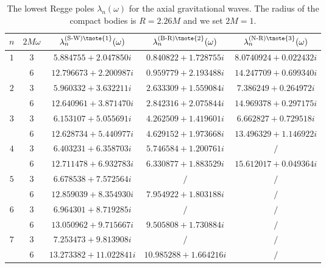\documentclass[aps,prd,longbibliography,reprint,twocolumn,amsmath,amssymb,amsfonts,showpacs,superscriptaddress]{revtex4-1}%
\begin{document}
\begingroup
\squeezetable
\begin{table}[htp]
\begin{threeparttable}[htp]
\caption{\label{tab:table4} The lowest Regge poles $\lambda_{n}(\omega)$ for the axial gravitational waves. The radius of the compact bodies is $R = 2.26M$ and we set $2M=1$.}
\smallskip
\centering
\begin{ruledtabular}
\begin{tabular}{ccccc}
 $n$ & $2M\omega$  & $\lambda^{\text{(S-W)\tnote{1}}}_n(\omega)$  & $\lambda^{\text{(B-R)\tnote{2}}}_n(\omega)$ & $\lambda^{\text{(N-R)\tnote{3}}}_n(\omega)$
 \\ \hline
$1$  & $3$  & $5.884755+2.047850 i $  & $0.840822+1.728755 i   $  & $8.0740924+0.022432 i   $   \\
     & $6$  & $12.796673+2.200987 i  $  & $0.959779+2.193488 i   $  & $14.247709+0.699340 i  $    \\

$2$  & $3$  & $5.960332+3.632211 i   $  & $2.633309+1.559084 i   $  & $7.386249+0.264972 i   $  \\
     & $6$  & $12.640961+3.871470 i  $  & $2.842316+2.075844 i  $  & $14.969378+0.297175 i  $  \\

$3$  & $3$  & $6.153107+5.055691 i   $  & $4.262509+1.419601 i   $  & $6.662827+0.729518 i  $   \\
     & $6$  & $ 12.628734+5.440977 i$  & $4.629152+1.973668 i  $  & $13.496329+1.146922 i  $  \\

$4$  & $3$  & $6.403231+6.358703 i  $  & $ 5.746584+1.200761 i$  & $/ $   \\
     & $6$  & $12.711478+6.932783 i  $  & $6.330877+1.883529 i  $  & $15.612017+0.049364 i  $   \\

$5$  & $3$  & $6.678538+7.572564 i $  & $ /$  & $/ $   \\
     & $6$  & $12.859039+8.354930 i   $  & $7.954922+1.803188 i    $  & $ /$  \\

$6$  & $3$  & $6.964301+8.719285 i  $  & $/ $  & $ /$  \\
     & $6$  & $13.050962+9.715667 i  $  & $9.505808+1.730884 i  $  & $/ $   \\

$7$  & $3$  & $7.253473+9.813908 i   $  & $ /$  & $/ $  \\
     & $6$  & $13.273382+11.022841 i  $  & $10.985288+1.664216 i   $  & $ /$   \\


\end{tabular}
\end{ruledtabular}
\end{threeparttable}
\end{table}
\end{document}

